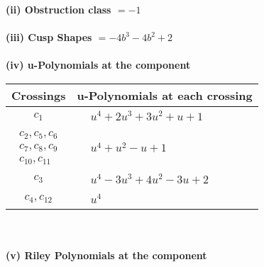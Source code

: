 \documentclass[1p]{elsarticle_modified}
\theoremstyle{definition}
\begin{document}
\flushleft \textbf{(ii) Obstruction class $= -1$}\\~\\
\flushleft \textbf{(iii) Cusp Shapes $= -4 b^3-4 b^2+2$}\\~\\
\newpage\renewcommand{\arraystretch}{1}
\flushleft \textbf{(iv) u-Polynomials at the component}\newline \\
\begin{tabular}{m{50pt}|m{274pt}}
Crossings & \hspace{64pt}u-Polynomials at each crossing \\
\hline $$\begin{aligned}c_{1}\end{aligned}$$&$\begin{aligned}
&u^4+2 u^3+3 u^2+u+1
\end{aligned}$\\
\hline $$\begin{aligned}c_{2},c_{5},c_{6}\\c_{7},c_{8},c_{9}\\c_{10},c_{11}\end{aligned}$$&$\begin{aligned}
&u^4+u^2- u+1
\end{aligned}$\\
\hline $$\begin{aligned}c_{3}\end{aligned}$$&$\begin{aligned}
&u^4-3 u^3+4 u^2-3 u+2
\end{aligned}$\\
\hline $$\begin{aligned}c_{4},c_{12}\end{aligned}$$&$\begin{aligned}
&u^4
\end{aligned}$\\
\hline
\end{tabular}\\~\\
\newpage\renewcommand{\arraystretch}{1}
\flushleft \textbf{(v) Riley Polynomials at the component}\newline \\
\end{document}

